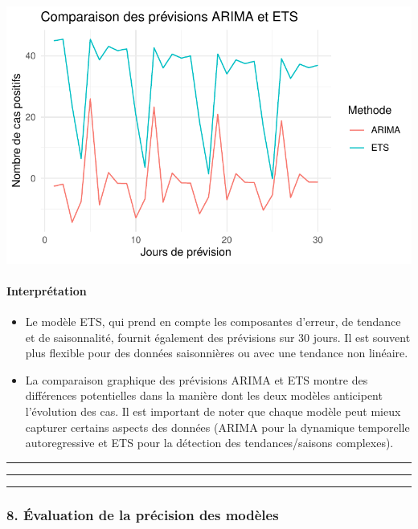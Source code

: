 \documentclass[
  letterpaper,
  DIV=11,
  numbers=noendperiod]{scrartcl}
\let\oldparagraph\paragraph
\renewcommand{\paragraph}[1]{\oldparagraph{#1}\mbox{}}
\begin{document}
\includegraphics{TS_files/figure-pdf/unnamed-chunk-8-1.pdf}

\paragraph{Interprétation}\label{interpruxe9tation-6}

\begin{itemize}
\item
  Le modèle ETS, qui prend en compte les composantes d'erreur, de
  tendance et de saisonnalité, fournit également des prévisions sur 30
  jours. Il est souvent plus flexible pour des données saisonnières ou
  avec une tendance non linéaire.
\item
  La comparaison graphique des prévisions ARIMA et ETS montre des
  différences potentielles dans la manière dont les deux modèles
  anticipent l'évolution des cas. Il est important de noter que chaque
  modèle peut mieux capturer certains aspects des données (ARIMA pour la
  dynamique temporelle autoregressive et ETS pour la détection des
  tendances/saisons complexes).
\end{itemize}

\begin{center}\rule{0.5\linewidth}{0.5pt}\end{center}

\begin{center}\rule{0.5\linewidth}{0.5pt}\end{center}

\begin{center}\rule{0.5\linewidth}{0.5pt}\end{center}

\subsubsection{8. Évaluation de la précision des
modèles}\label{uxe9valuation-de-la-pruxe9cision-des-moduxe8les}
\end{document}
